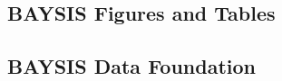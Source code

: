 \begin{appendices}

    \chapter{BAYSIS Figures and Tables}
    \label{appendix_baysis}
    
    \tocless\section{BAYSIS Data Foundation}
    \label{appendix_baysis_dataset}
    




\end{appendices}
